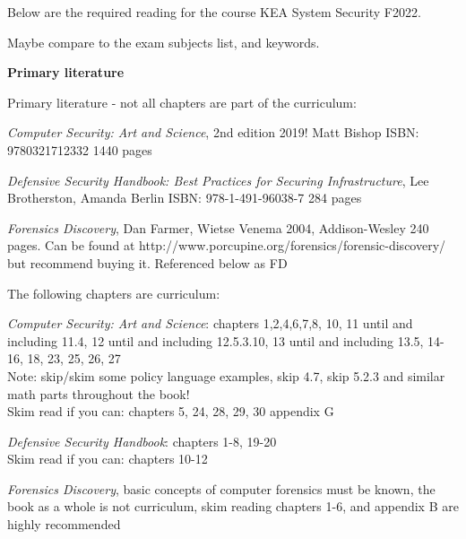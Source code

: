 \documentclass[a4paper,11pt,notitlepage,landscape]{report}
\begin{document}
{}


\normal

Below are the required reading for the course KEA System Security F2022.

Maybe compare to the exam subjects list, and keywords.


{\bf Primary literature}

Primary literature - not all chapters are part of the curriculum:
\begin{list2}
\item \emph{Computer Security: Art and Science}, 2nd edition 2019! Matt Bishop ISBN: 9780321712332 1440 pages
\item \emph{Defensive Security Handbook: Best Practices for Securing Infrastructure}, Lee Brotherston, Amanda Berlin ISBN: 978-1-491-96038-7 284 pages
\item \emph{Forensics Discovery}, Dan Farmer, Wietse Venema 2004, Addison-Wesley 240 pages. Can be found at http://www.porcupine.org/forensics/forensic-discovery/ but recommend buying it. Referenced below as FD
\end{list2}

The following chapters are curriculum:

\begin{list2}
\item \emph{Computer Security: Art and Science}: chapters 1,2,4,6,7,8, 10, 11 until and including 11.4, 12 until and including 12.5.3.10, 13 until and including 13.5, 14-16, 18, 23, 25, 26, 27
\\
Note: skip/skim some policy language examples, skip 4.7, skip 5.2.3 and similar math parts throughout the book!\\
Skim read if you can: chapters 5, 24, 28, 29, 30 appendix G


\item \emph{Defensive Security Handbook}: chapters 1-8, 19-20\\
Skim read if you can: chapters 10-12
\item \emph{Forensics Discovery}, basic concepts of computer forensics must be known, the book as a whole is not curriculum, skim reading chapters 1-6, and appendix B are highly recommended
\end{list2}
\end{document}
